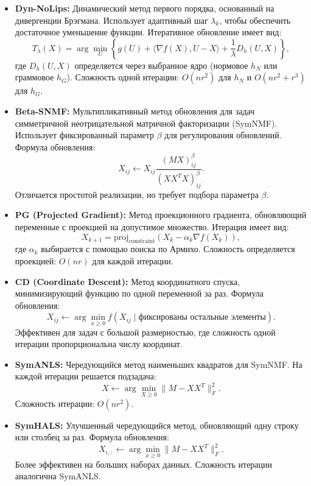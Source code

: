 \documentclass[a4paper,11pt]{article}
\begin{document}
\begin{itemize}
    \item \textbf{Dyn-NoLips:}
    Динамический метод первого порядка, основанный на дивергенции Брэгмана. Использует адаптивный шаг $\lambda_k$, чтобы
    обеспечить достаточное уменьшение функции. Итеративное обновление имеет вид:
    \[
    T_\lambda(X) = \arg\min_U \left\{ g(U) + \langle \nabla f(X), U - X \rangle + \frac{1}{\lambda} D_h(U, X) \right\},
    \]
    где $D_h(U, X)$ определяется через выбранное ядро (нормовое $h_N$ или граммовое $h_G$).
    Сложность одной итерации: $O(nr^2)$ для $h_N$ и $O(nr^2 + r^3)$ для $h_G$.

    \item \textbf{Beta-SNMF:}
    Мультипликативный метод обновления для задач симметричной неотрицательной матричной факторизации (SymNMF).
    Использует фиксированный параметр $\beta$ для регулирования обновлений. Формула обновления:
    \[
    X_{ij} \leftarrow X_{ij} \frac{(M X)_{ij}^\beta}{(X X^T X)_{ij}^\beta}.
    \]
    Отличается простотой реализации, но требует подбора параметра $\beta$.

    \item \textbf{PG (Projected Gradient):}
    Метод проекционного градиента, обновляющий переменные с проекцией на допустимое множество. Итерация имеет вид:
    \[
    X_{k+1} = \text{proj}_{\text{constraint}}(X_k - \alpha_k \nabla f(X_k)),
    \]
    где $\alpha_k$ выбирается с помощью поиска по Армихо.
    Сложность определяется проекцией: $O(nr)$ для каждой итерации.

    \item \textbf{CD (Coordinate Descent):}
    Метод координатного спуска, минимизирующий функцию по одной переменной за раз. Формула обновления:
    \[
    X_{ij} \leftarrow \arg\min_{x \geq 0} f(X_{ij} \mid \text{фиксированы остальные элементы}).
    \]
    Эффективен для задач с большой размерностью, где сложность одной итерации пропорциональна числу координат.

    \item \textbf{SymANLS:}
    Чередующийся метод наименьших квадратов для SymNMF. На каждой итерации решается подзадача:
    \[
    X \leftarrow \arg\min_{X \geq 0} \|M - XX^T\|_F^2.
    \]
    Сложность итерации: $O(nr^2)$.

    \item \textbf{SymHALS:}
    Улучшенный чередующийся метод, обновляющий одну строку или столбец за раз. Формула обновления:
    \[
    X_{i,:} \leftarrow \arg\min_{x \geq 0} \|M - XX^T\|_F^2.
    \]
    Более эффективен на больших наборах данных. Сложность итерации аналогична SymANLS.
\end{itemize}
\end{document}
